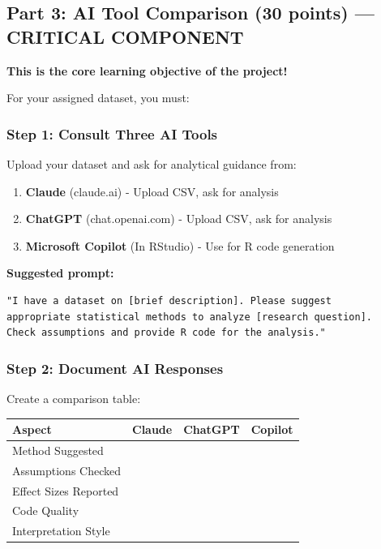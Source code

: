 \documentclass[11pt]{article}
\begin{document}
\subsection{Part 3: AI Tool Comparison (30 points) --- \textcolor{aiblue}{CRITICAL COMPONENT}}

\textbf{This is the core learning objective of the project!}

For your assigned dataset, you must:

\subsubsection{Step 1: Consult Three AI Tools}

Upload your dataset and ask for analytical guidance from:
\begin{enumerate}
\item \textbf{Claude} (claude.ai) - Upload CSV, ask for analysis
\item \textbf{ChatGPT} (chat.openai.com) - Upload CSV, ask for analysis
\item \textbf{Microsoft Copilot} (In RStudio) - Use for R code generation
\end{enumerate}

\textbf{Suggested prompt:}
\begin{verbatim}
"I have a dataset on [brief description]. Please suggest
appropriate statistical methods to analyze [research question].
Check assumptions and provide R code for the analysis."
\end{verbatim}

\subsubsection{Step 2: Document AI Responses}

Create a comparison table:

\begin{center}
\begin{tabular}{|p{2.5cm}|p{3.5cm}|p{3.5cm}|p{3.5cm}|}
\hline
\textbf{Aspect} & \textbf{Claude} & \textbf{ChatGPT} & \textbf{Copilot} \\
\hline
Method Suggested & & & \\
\hline
Assumptions Checked & & & \\
\hline
Effect Sizes Reported & & & \\
\hline
Code Quality & & & \\
\hline
Interpretation Style & & & \\
\hline
\end{tabular}
\end{center}
\end{document}
